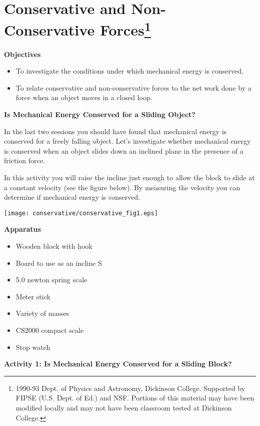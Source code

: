 
\section{Conservative and Non-Conservative Forces\footnote{
1990-93 Dept. of Physics and Astronomy, Dickinson College. Supported by FIPSE
(U.S. Dept. of Ed.) and NSF. Portions of this material may have been modified
locally and may not have been classroom tested at Dickinson College.
}}

\makelabheader %

\textbf{Objectives} 

\begin{itemize}
\item To investigate the conditions under which mechanical energy is conserved. 
\item To relate conservative and non-conservative forces to the net work done by a
force when an object moves in a closed loop.
\end{itemize}
\textbf{Is Mechanical Energy Conserved for a Sliding Object? }

In the last two sessions you should have found that mechanical energy is conserved
for a freely falling object. Let's investigate whether mechanical energy is
conserved when an object slides down an inclined plane in the presence of a
friction force.

In this activity you will raise the incline just enough to allow the block to
slide at a constant velocity (see the figure below). By measuring the velocity
you can determine if mechanical energy is conserved.

\vspace{0.3cm}
{\par\centering \texttt{[image: conservative/conservative\_fig1.eps]} \par}
\vspace{0.3cm}

\textbf{Apparatus} 

\begin{itemize}
\item Wooden block with hook 
\item Board to use as an incline S
\item 5.0 newton spring scale 
\item Meter stick 
\item Variety of masses 
\item CS2000 compact scale
\item Stop watch
\end{itemize}
\textbf{Activity 1: Is Mechanical Energy Conserved for a Sliding Block? }

